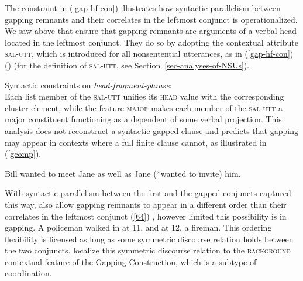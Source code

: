 The constraint in (\ref{gap-hf-con}) illustrates how syntactic parallelism between gapping remnants and their correlates in the leftmost conjunct is operationalized. We saw above that \citet{Abeille2014} ensure that gapping remnants are arguments of a verbal head located in the leftmost conjunct. They do so by adopting the contextual attribute \textsc{sal-utt}, which is introduced for all nonsentential utterances, as in (\ref{gap-hf-con}) (\citealt[259]{Abeille2014}) (for the definition of \textsc{sal-utt}, see Section~\ref{sec-analyses-of-NSUs}).

 \ea
\label{gap-hf-con}
Syntactic constraints on \emph{head-fragment-phrase}:\\
 \impl
{}
\z
 Each list member of the \textsc{sal-utt} unifies 
its \textsc{head} value with the corresponding cluster element, while the feature \textsc{major} makes each member of the \textsc{sal-utt} a major constituent functioning as a dependent of some verbal projection. %
This analysis does not reconstruct a syntactic gapped clause and %
predicts that gapping may appear in contexts where a full finite clause cannot, as illustrated in (\ref{gcomp}).
 
 \ea 
 Bill wanted to meet Jane as well as Jane (*wanted to invite) him. \citep[242]{Abeille2014}\label{gcomp}
 \z
%

   With syntactic parallelism between the first and
   the gapped conjuncts captured this way, \citet{Abeille2014} also allow 
    gapping remnants to appear in a different order than their correlates in the leftmost conjunct (\ref{64}) \citep[see][156--158]{Sag1985}, however limited this possibility is in gapping.
%
\ea A policeman walked in at 11, and at 12, a fireman. \label{64}\z
%
%
This ordering flexibility is licensed as long as some symmetric discourse relation holds between the two conjuncts. \citet{Abeille2014} 
localize this symmetric discourse relation to the \textsc{background} contextual feature of the Gapping Construction, which is a subtype of coordination. 

